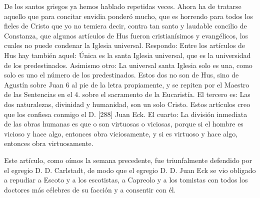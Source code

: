 De los santos griegos ya hemos hablado repetidas veces. Ahora ha de tratarse aquello que para concitar envidia ponderó mucho, que es horrendo para todos los fieles de Cristo que yo no temiera decir, contra tan santo y laudable concilio de Constanza, que algunos artículos de Hus fueron cristianísimos y evangélicos, los cuales no puede condenar la Iglesia universal. Respondo: Entre los artículos de Hus hay también aquel: Única es la santa Iglesia universal, que es la universidad de los predestinados. Asimismo otro: La universal santa Iglesia solo es una, como solo es uno el número de los predestinados. Estos dos no son de Hus, sino de Agustín sobre Juan 6 al pie de la letra propiamente, y se repiten por el Maestro de las Sentencias en el 4. sobre el sacramento de la Eucaristía. El tercero es: Las dos naturalezas, divinidad y humanidad, son un solo Cristo. Estos artículos creo que los confiesa conmigo el D. [288] Juan Eck. El cuarto: La división inmediata de las obras humanas es que o son virtuosas o viciosas, porque si el hombre es vicioso y hace algo, entonces obra viciosamente, y si es virtuoso y hace algo, entonces obra virtuosamente.

Este artículo, como oímos la semana precedente, fue triunfalmente defendido por el egregio D. D. Carlstadt, de modo que el egregio D. D. Juan Eck se vio obligado a repudiar a Escoto y a los escotistas, a Capreolo y a los tomistas con todos los doctores más célebres de su facción y a consentir con él.

